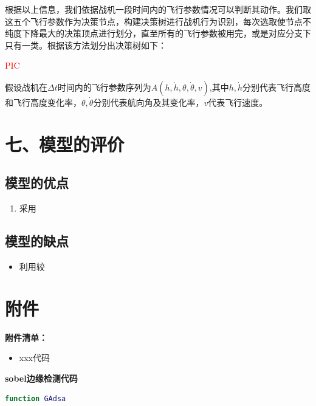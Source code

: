 \documentclass{my_paper}
\begin{document}
根据以上信息，我们依据战机一段时间内的飞行参数情况可以判断其动作。我们取这五个飞行参数作为决策节点，构建决策树进行战机行为识别，每次选取使节点不纯度下降最大的决策顶点进行划分，直至所有的飞行参数被用完，或是对应分支下只有一类。根据该方法划分出决策树如下：


\textcolor{red}{PIC}

假设战机在$\Delta t$时间内的飞行参数序列为$A(h,\dot{h},\theta,\dot{\theta},v )$,其中$h,\dot{h}$分别代表飞行高度和飞行高度变化率，$\theta,\dot{\theta}$分别代表航向角及其变化率，$v$代表飞行速度。


\section{七、模型的评价}

\subsection{模型的优点}
\begin{enumerate}
    \item 采用

\end{enumerate}

\subsection{模型的缺点}
\begin{itemize}
    \item 利用较

\end{itemize}

\newpage
\begin{center}
\end{center}

\newpage
\section{附件}
\textbf{附件清单：}
\begin{itemize}
    \item xxx代码
\end{itemize}

\textbf{sobel边缘检测代码}

\begin{lstlisting}[language=matlab]
    function GAdsa 
\end{lstlisting}
\end{document}
